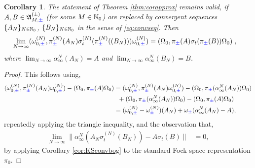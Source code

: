 \documentclass[a4paper, 11pt]{article}
\newcommand{\fA}{\mathfrak{A}}\newcommand{\cA}{\mathcal{A}}\newcommand{\dA}{\mathds{A}}\newcommand{\sA}{\mathscr{A}}
\DeclareMathOperator{\1}{\mathds{1}}
\newtheorem{cor}[thm]{Corollary}
\begin{document}
\begin{cor}
\label{cor:corapprox}
The statement of Theorem \ref{thm:corapprox} remains valid, if $A,B\in\fA^{(\pm)}_{M,{\color{blue}\pm}}$ (for some $M\in\mathbb{N}_{0}$) are replaced by convergent sequences $\{A_{N}\}_{N\in\mathbb{N}_{0}}$, $\{B_{N}\}_{N\in\mathbb{N}_{0}}$ in the sense of \eqref{eq:convseq}. Then
\begin{align*}
\lim_{N\rightarrow\infty}(\omega^{(N)}_{0,{\color{blue}\pm}},\pi^{(N)}_{{\color{blue}\pm}}(A_{N})\sigma^{(N)}_{t}(\pi^{(N)}_{{\color{blue}\pm}}((B_{N})))\omega^{(N)}_{0,{\color{blue}\pm}}) & = (\Omega_{0},\pi_{{\color{blue}\pm}}(A)\sigma_{t}(\pi_{{\color{blue}\pm}}(B))\Omega_{0})\;,
\end{align*}
where $\lim_{N\rightarrow\infty}\alpha^{N}_{\infty}(A_{N}) = A$ and $\lim_{N\rightarrow\infty}\alpha^{N}_{\infty}(B_{N}) = B$.
\end{cor}
\begin{proof}
This follows using,
\begin{align*}
(\omega^{(N)}_{0,{\color{blue}\pm}},\pi^{(N)}_{{\color{blue}\pm}}(A_{N})\omega^{(N)}_{0,{\color{blue}\pm}}) - (\Omega_{0},\pi_{{\color{blue}\pm}}(A)\Omega_{0})& = (\omega^{(N)}_{0,{\color{blue}\pm}},\pi^{(N)}_{{\color{blue}\pm}}(A_{N})\omega^{(N)}_{0,{\color{blue}\pm}}) - (\Omega_{0},\pi_{{\color{blue}\pm}}(\alpha^{N}_{\infty}(A_{N}))\Omega_{0}) \\
& \hspace{0.2cm} + (\Omega_{0},\pi_{{\color{blue}\pm}}(\alpha^{N}_{\infty}(A_{N}))\Omega_{0}) - (\Omega_{0},\pi_{{\color{blue}\pm}}(A)\Omega_{0}) \\
& = (\omega^{(N)}_{0,{\color{blue}\pm}} - \omega^{(N)}_{{\color{blue}\pm}})(A_{N})+\omega_{{\color{blue}\pm}}(\alpha^{N}_{\infty}(A_{N})-A),
\end{align*}
repeatedly applying the triangle inequality, and the observation that,
\begin{align*}
\lim_{N\rightarrow\infty}\|\alpha^{N}_{\infty}(A_{N}\sigma^{(N)}_{t}(B_{N}))-A\sigma_{t}(B)\| & = 0,
\end{align*}
by applying Corollary \ref{cor:KSconvbog} to the standard Fock-space representation $\pi_{0}$.
\end{proof}
\end{document}
